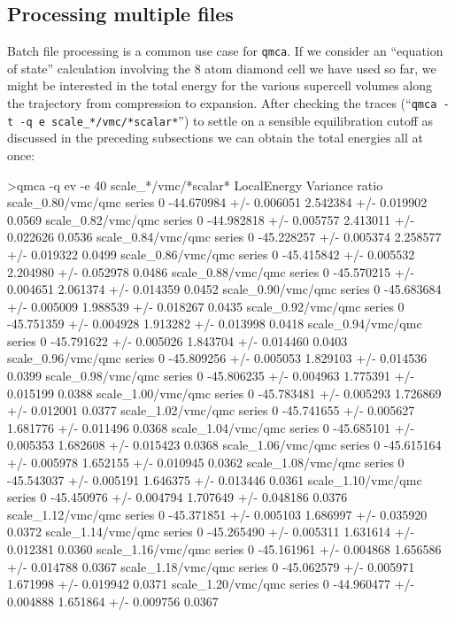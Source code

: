 \subsection{Processing multiple files}
\label{sec:qmca_multiple_files}
Batch file processing is a common use case for \texttt{qmca}. 
If we consider an ``equation of state'' calculation involving 
the 8 atom diamond cell we have used so far, we might be interested 
in the total energy for the various supercell volumes along the 
trajectory from compression to expansion.  After checking 
the traces (``\texttt{qmca -t -q e scale\_*/vmc/*scalar*}'') 
to settle on a sensible equilibration cutoff as discussed in 
the preceding subsections we can obtain the total energies 
all at once:
\begin{shade}
>qmca -q ev -e 40 scale_*/vmc/*scalar*
                            LocalEnergy               Variance           ratio 
scale_0.80/vmc/qmc  series 0 -44.670984 +/- 0.006051  2.542384 +/- 0.019902  0.0569 
scale_0.82/vmc/qmc  series 0 -44.982818 +/- 0.005757  2.413011 +/- 0.022626  0.0536 
scale_0.84/vmc/qmc  series 0 -45.228257 +/- 0.005374  2.258577 +/- 0.019322  0.0499 
scale_0.86/vmc/qmc  series 0 -45.415842 +/- 0.005532  2.204980 +/- 0.052978  0.0486 
scale_0.88/vmc/qmc  series 0 -45.570215 +/- 0.004651  2.061374 +/- 0.014359  0.0452 
scale_0.90/vmc/qmc  series 0 -45.683684 +/- 0.005009  1.988539 +/- 0.018267  0.0435 
scale_0.92/vmc/qmc  series 0 -45.751359 +/- 0.004928  1.913282 +/- 0.013998  0.0418 
scale_0.94/vmc/qmc  series 0 -45.791622 +/- 0.005026  1.843704 +/- 0.014460  0.0403 
scale_0.96/vmc/qmc  series 0 -45.809256 +/- 0.005053  1.829103 +/- 0.014536  0.0399 
scale_0.98/vmc/qmc  series 0 -45.806235 +/- 0.004963  1.775391 +/- 0.015199  0.0388 
scale_1.00/vmc/qmc  series 0 -45.783481 +/- 0.005293  1.726869 +/- 0.012001  0.0377 
scale_1.02/vmc/qmc  series 0 -45.741655 +/- 0.005627  1.681776 +/- 0.011496  0.0368 
scale_1.04/vmc/qmc  series 0 -45.685101 +/- 0.005353  1.682608 +/- 0.015423  0.0368 
scale_1.06/vmc/qmc  series 0 -45.615164 +/- 0.005978  1.652155 +/- 0.010945  0.0362 
scale_1.08/vmc/qmc  series 0 -45.543037 +/- 0.005191  1.646375 +/- 0.013446  0.0361 
scale_1.10/vmc/qmc  series 0 -45.450976 +/- 0.004794  1.707649 +/- 0.048186  0.0376 
scale_1.12/vmc/qmc  series 0 -45.371851 +/- 0.005103  1.686997 +/- 0.035920  0.0372 
scale_1.14/vmc/qmc  series 0 -45.265490 +/- 0.005311  1.631614 +/- 0.012381  0.0360 
scale_1.16/vmc/qmc  series 0 -45.161961 +/- 0.004868  1.656586 +/- 0.014788  0.0367 
scale_1.18/vmc/qmc  series 0 -45.062579 +/- 0.005971  1.671998 +/- 0.019942  0.0371 
scale_1.20/vmc/qmc  series 0 -44.960477 +/- 0.004888  1.651864 +/- 0.009756  0.0367 
\end{shade}
\noindent

